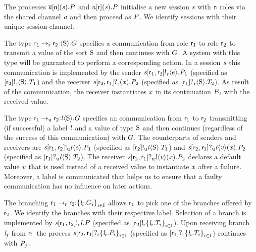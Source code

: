 The processes $ \PReq{\Chan[a]}{\Role[n]}{\Chan}{P} $ and $ \PAcc{\Chan[a]}{\Role}{\Chan}{P} $ initialise a new session $ \Chan $ with $ \Role[n] $ roles via the shared channel $ \Chan[a] $ and then proceed as $ \PT $. We identify sessions with their unique session channel.

The type $ \GComR{\Role_1}{\Role_2}{\Sort}{\GT} $ specifies a \strongR communication from role $ \Role_1 $ to role $ \Role_2 $ to transmit a value of the sort $ \Sort $ and then continues with $ \GT $.
A system with this type will be guaranteed to perform a corresponding action.
In a session $ \Chan $ this communication is implemented by the sender $ \PSendR{\Chan}{\Role_1}{\Role_2}{\Expr}{\PT_1} $ (specified as $ \LSendR{\Role_2}{\Sort}{\LT_1} $) and the receiver $ \PGetR{\Chan}{\Role_2}{\Role_1}{\Args}{\PT_2} $ (specified as $ \LGetR{\Role_1}{\Sort}{\LT_2} $).
As result of the communication, the receiver instantiates $ \Args $ in its continuation $ \PT_2 $ with the received value.

The type $ \GComU{\Role_1}{\Role_2}{\Label}{\Sort}{\GT} $ specifies an \unrel communication from $ \Role_1 $ to $ \Role_2 $ transmitting (if successful) a label $ \Label $ and a value of type $ \Sort $ and then continues (regardless of the success of this communication) with $ \GT $.
The \unrel counterparts of senders and receivers are $ \PSendU{\Chan}{\Role_1}{\Role_2}{\Label}{\Expr}{\PT_1} $ (specified as $ \LSendU{\Role_2}{\Label}{\Sort}{\LT_1} $) and $ \PGetU{\Chan}{\Role_2}{\Role_1}{\Label}{\Args[v]}{\Args}{\PT_2} $ (specified as $ \LGetU{\Role_1}{\Label}{\Sort}{\LT_2} $).
The receiver $ \PGetU{\Chan}{\Role_2}{\Role_1}{\Label}{\Args[v]}{\Args}{\PT_2} $ declares a default value $ \Args[v] $ that is used instead of a received value to instantiate $ \Args $ after a failure.
Moreover, a label is communicated that helps us to ensure that a faulty \unrel communication has no influence on later actions.

The \strongR branching $ \GBranR{\Role_1}{\Role_2}{\Set{ \Label_i.\GT_i}_{i \in \indexSet}} $ allows $ \Role_1 $ to pick one of the branches offered by $ \Role_2 $.
We identify the branches with their respective label.
Selection of a branch is implemented by $ \PSelR{\Chan}{\Role_1}{\Role_2}{\Label}{P} $ (specified as $ \LSelR{\Role_2}{\Set{ \Label_i.\LT_i }_{i \in \indexSet}} $).
Upon receiving branch $ \Label_j $ from $ \Role_1 $ the process $ \PBranR{\Chan}{\Role_2}{\Role_1}{\Set{ \Label_i.P_i }_{i \in \indexSet}} $ (specified as $ \LBranR{\Role_1}{\Set{ \Label_i.\LT_i }_{i \in \indexSet}} $) continues with $ \PT_j $.

